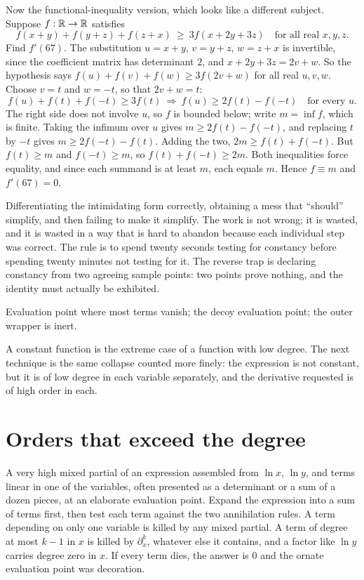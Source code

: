 \begin{worked}
Now the functional-inequality version, which looks like a different subject. Suppose $f:\mathbb{R}\to\mathbb{R}$ satisfies
\[
f(x+y)+f(y+z)+f(z+x)\ \geq\ 3f(x+2y+3z)\quad\text{for all real }x,y,z .
\]
Find $f'(67)$. The substitution $u=x+y$, $v=y+z$, $w=z+x$ is invertible, since the coefficient matrix has determinant $2$, and $x+2y+3z=2v+w$. So the hypothesis says $f(u)+f(v)+f(w)\geq3f(2v+w)$ for all real $u,v,w$. Choose $v=t$ and $w=-t$, so that $2v+w=t$:
\[
f(u)+f(t)+f(-t)\geq3f(t)\ \Longrightarrow\ f(u)\geq 2f(t)-f(-t)\quad\text{for every }u .
\]
The right side does not involve $u$, so $f$ is bounded below; write $m=\inf f$, which is finite. Taking the infimum over $u$ gives $m\geq 2f(t)-f(-t)$, and replacing $t$ by $-t$ gives $m\geq 2f(-t)-f(t)$. Adding the two, $2m\geq f(t)+f(-t)$. But $f(t)\geq m$ and $f(-t)\geq m$, so $f(t)+f(-t)\geq 2m$. Both inequalities force equality, and since each summand is at least $m$, each equals $m$. Hence $f\equiv m$ and $f'(67)=0$.
\end{worked}

\begin{trap}
Differentiating the intimidating form correctly, obtaining a mess that ``should'' simplify, and then failing to make it simplify. The work is not wrong; it is wasted, and it is wasted in a way that is hard to abandon because each individual step was correct. The rule is to spend twenty seconds testing for constancy before spending twenty minutes not testing for it. The reverse trap is declaring constancy from two agreeing sample points: two points prove nothing, and the identity must actually be exhibited.
\end{trap}

\begin{seealsob}Evaluation point where most terms vanish; the decoy evaluation point; the outer wrapper is inert.\end{seealsob}

A constant function is the extreme case of a function with low degree. The next technique is the same collapse counted more finely: the expression is not constant, but it is of low degree in each variable separately, and the derivative requested is of high order in each.

\section{Orders that exceed the degree}

\cue A very high mixed partial of an expression assembled from $\ln x$, $\ln y$, and terms linear in one of the variables, often presented as a determinant or a sum of a dozen pieces, at an elaborate evaluation point.
\method Expand the expression into a sum of terms first, then test each term against the two annihilation rules. A term depending on only one variable is killed by any mixed partial. A term of degree at most $k-1$ in $x$ is killed by $\partial_{x}^{k}$, whatever else it contains, and a factor like $\ln y$ carries degree zero in $x$. If every term dies, the answer is $0$ and the ornate evaluation point was decoration.


